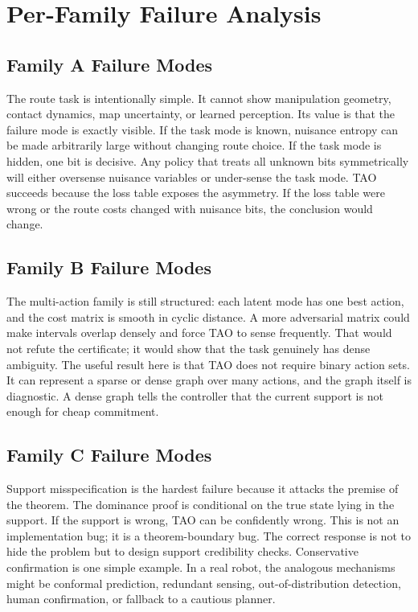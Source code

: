 \documentclass{article}
\begin{document}
\section{Per-Family Failure Analysis}

\subsection{Family A Failure Modes}

The route task is intentionally simple. It cannot show manipulation geometry, contact dynamics, map uncertainty, or learned perception. Its value is that the failure mode is exactly visible. If the task mode is known, nuisance entropy can be made arbitrarily large without changing route choice. If the task mode is hidden, one bit is decisive. Any policy that treats all unknown bits symmetrically will either oversense nuisance variables or under-sense the task mode. TAO succeeds because the loss table exposes the asymmetry. If the loss table were wrong or the route costs changed with nuisance bits, the conclusion would change.

\subsection{Family B Failure Modes}

The multi-action family is still structured: each latent mode has one best action, and the cost matrix is smooth in cyclic distance. A more adversarial matrix could make intervals overlap densely and force TAO to sense frequently. That would not refute the certificate; it would show that the task genuinely has dense ambiguity. The useful result here is that TAO does not require binary action sets. It can represent a sparse or dense graph over many actions, and the graph itself is diagnostic. A dense graph tells the controller that the current support is not enough for cheap commitment.

\subsection{Family C Failure Modes}

Support misspecification is the hardest failure because it attacks the premise of the theorem. The dominance proof is conditional on the true state lying in the support. If the support is wrong, TAO can be confidently wrong. This is not an implementation bug; it is a theorem-boundary bug. The correct response is not to hide the problem but to design support credibility checks. Conservative confirmation is one simple example. In a real robot, the analogous mechanisms might be conformal prediction, redundant sensing, out-of-distribution detection, human confirmation, or fallback to a cautious planner.
\end{document}
